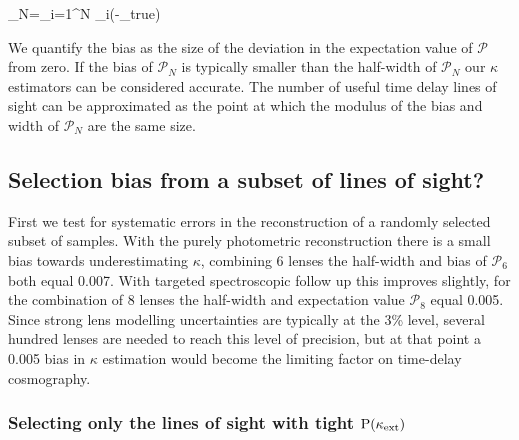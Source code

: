\documentclass[useAMS,usenatbib]{mn2e}
\begin{document}
\be
\label{eq:bias}
_N=\prod_{i=1}^N \pr_i(\kappa-\kappa_{\rm true})
\ee

We quantify the bias as the size of the deviation in the expectation value of $\mathcal{P}$ from zero. If the bias of $\mathcal{P}_N$ is typically smaller than the half-width of $\mathcal{P}_N$ our $\kappa$ estimators can be considered accurate. The number of useful time delay lines of sight can be approximated as the point at which the modulus of the bias and width of $\mathcal{P}_N$ are the same size.

\subsection{Selection bias from a subset of lines of sight?}

First we test for systematic errors in the reconstruction of a randomly selected subset of samples. With the purely photometric reconstruction there is a small bias towards underestimating $\kappa$,  combining 6 lenses the half-width and bias of $\mathcal{P}_{6}$ both equal 0.007. With targeted spectroscopic follow up this improves slightly, for the combination of 8 lenses the half-width and expectation value  $\mathcal{P}_{8}$ equal 0.005. Since strong lens modelling uncertainties are typically at the 3\% level, several hundred lenses are needed to reach this level of precision, but at that point a 0.005 bias in $\kappa$ estimation would become the limiting factor on time-delay cosmography.


\subsubsection{Selecting only the lines of sight with tight ${\rm P}(\kappa_{\rm ext})$}
\label{sec:tightPDF}
\end{document}
